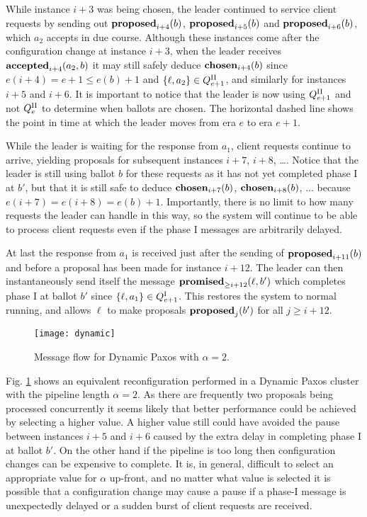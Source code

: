 \documentclass[journal]{IEEEtran}
\begin{document}
While instance $i+3$ was being chosen, the leader continued to service client
requests by sending out $\mathbf{proposed}_{i+4}(b)$, $\mathbf{proposed}_{i+5}(b)$ and $\mathbf{proposed}_{i+6}(b)$,
which $a_2$ accepts in due course. Although these instances come after the
configuration change at instance $i+3$, when the leader receives
$\mathbf{accepted}_{i+4}(a_2,b)$ it may still safely deduce $\mathbf{chosen}_{i+4}(b)$ since $e(i+4)
= e + 1 \le e(b) + 1$ and $\{ \ell, a_2 \} \in {Q}^\textrm{II}_{e+1}$, and similarly for
instances $i+5$ and $i+6$. It is important to notice that the leader is now
using ${Q}^\textrm{II}_{e+1}$ and not ${Q}^\textrm{II}_{e}$ to determine when ballots are chosen. The
horizontal dashed line shows the point in time at which the leader moves from
era $e$ to era $e+1$.

While the leader is waiting for the response from $a_1$, client requests
continue to arrive, yielding proposals for subsequent instances $i+7$, $i+8$,
\ldots.  Notice that the leader is still using ballot $b$ for these requests as
it has not yet completed phase I at $b'$, but that it is still safe to deduce
$\mathbf{chosen}_{i+7}(b)$, $\mathbf{chosen}_{i+8}(b)$, $\ldots$ because $e(i+7) = e(i+8) =
e(b)+1$.  Importantly, there is no limit to how many requests the leader can
handle in this way, so the system will continue to be able to process client
requests even if the phase I messages are arbitrarily delayed.

At last the response from $a_1$ is received just after the sending of
$\mathbf{proposed}_{i+11}(b)$ and before a proposal has been made for instance $i+12$. The
leader can then instantaneously send itself the message
$\mathbf{promised}_{\ge i+12}(\ell,b')$ which completes phase I at ballot $b'$ since $\{\ell,
a_1\} \in {Q}^\textrm{I}_{e+1}$.  This restores the system to normal running, and allows
$\ell$ to make proposals $\mathbf{proposed}_{j}(b')$ for all $j \ge i+12$.

\begin{figure}[!t]
\centering
\texttt{[image: dynamic]}
\caption{Message flow for Dynamic Paxos with $\alpha = 2$. \label{seq-diag-dynamic}}
\end{figure}

Fig. \ref{seq-diag-dynamic} shows an equivalent reconfiguration performed in a
Dynamic Paxos cluster with the pipeline length $\alpha = 2$. As there are
frequently two proposals being processed concurrently it seems likely that
better performance could be achieved by selecting a higher value. A higher
value still could have avoided the pause between instances $i+5$ and $i+6$
caused by the extra delay in completing phase I at ballot $b'$. On the other
hand if the pipeline is too long then configuration changes can be expensive to
complete. It is, in general, difficult to select an appropriate value for
$\alpha$ up-front, and no matter what value is selected it is possible that a
configuration change may cause a pause if a phase-I message is unexpectedly
delayed or a sudden burst of client requests are received.
\end{document}
